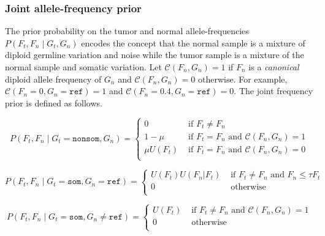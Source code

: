 \documentclass{article}
\begin{document}
\subsubsection{Joint allele-frequency prior}
The prior probability on the tumor and normal allele-frequencies $P(F_t, F_n \mid G_t, G_n)$ encodes the concept that the normal sample is a mixture of diploid germline variation and noise while the tumor sample is a mixture of the normal sample and somatic variation. Let $\mathcal{C} (F_n, G_n) = 1$ if $F_n$ is a {\em canonical} diploid allele frequency of $G_n$ and $\mathcal{C} (F_n, G_n) = 0$ otherwise. For example, $\mathcal{C} (F_n=0, G_n = \texttt{ref}) = 1$ and $\mathcal{C} (F_n=0.4, G_n = \texttt{ref}) = 0$. The joint frequency prior is defined as follows.

\begin{equation*}
P(F_t, F_n \mid G_t = \texttt{nonsom}, G_n)=
\begin{cases}
	0 & \text{ if } F_t \neq F_n \\
	1-\mu & \text{ if } F_t = F_n \text{ and }\mathcal{C}(F_n, G_n) = 1 \\
	\mu U(F_t) & \text{ if } F_t = F_n \text{ and }\mathcal{C}(F_n, G_n) = 0 \\
\end{cases}
\end{equation*}

\begin{equation*}
P(F_t, F_n \mid G_t = \texttt{som}, G_n = \texttt{ref})=
\begin{cases}
	U(F_t) U(F_n|F_t) & \text{ if } F_t \neq F_n \text{ and } F_n \leq \tau F_t \\
	0 & \text{ otherwise } \\
\end{cases}
\end{equation*}

\begin{equation*}
P(F_t, F_n \mid G_t = \texttt{som}, G_n \neq \texttt{ref})=
\begin{cases}
	U(F_t) & \text{ if } F_t \neq F_n \text{ and } \mathcal{C}(F_n, G_n) = 1 \\
	0 & \text{ otherwise } \\
\end{cases}
\end{equation*}
\end{document}
